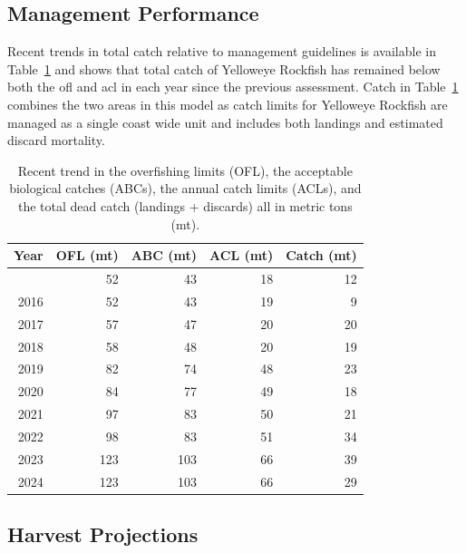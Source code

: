 \documentclass[
]{scrartcl}
\begin{document}
\clearpage

\subsection*{Management Performance}\label{management-performance}

Recent trends in total catch relative to management guidelines is
available in Table~\ref{tbl-es-management} and shows that total catch of
Yelloweye Rockfish has remained below both the \gls{ofl} and \gls{acl}
in each year since the previous assessment. Catch in
Table~\ref{tbl-es-management} combines the two areas in this model as
catch limits for Yelloweye Rockfish are managed as a single coast wide
unit and includes both landings and estimated discard mortality.

\begingroup
\fontsize{9.0pt}{10.8pt}\selectfont

\begin{longtable}{rrrrr}

\caption{\label{tbl-es-management}Recent trend in the overfishing limits
(OFL), the acceptable biological catches (ABCs), the annual catch limits
(ACLs), and the total dead catch (landings + discards) all in metric
tons (mt).}

\tabularnewline

\toprule
Year & OFL (mt) & ABC (mt) & ACL (mt) & Catch (mt) \\ 
\midrule\addlinespace[2.5pt]
2015 & 52 & 43 & 18 & 12 \\ 
2016 & 52 & 43 & 19 & 9 \\ 
2017 & 57 & 47 & 20 & 20 \\ 
2018 & 58 & 48 & 20 & 19 \\ 
2019 & 82 & 74 & 48 & 23 \\ 
2020 & 84 & 77 & 49 & 18 \\ 
2021 & 97 & 83 & 50 & 21 \\ 
2022 & 98 & 83 & 51 & 34 \\ 
2023 & 123 & 103 & 66 & 39 \\ 
2024 & 123 & 103 & 66 & 29 \\ 
\bottomrule

\end{longtable}

\endgroup

\subsection*{Harvest Projections}\label{harvest-projections}
\end{document}
